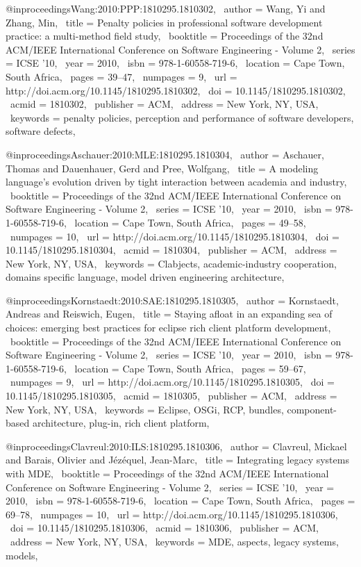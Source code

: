 @inproceedings{Wang:2010:PPP:1810295.1810302,
 author = {Wang, Yi and Zhang, Min},
 title = {Penalty policies in professional software development practice: a multi-method field study},
 booktitle = {Proceedings of the 32nd ACM/IEEE International Conference on Software Engineering - Volume 2},
 series = {ICSE '10},
 year = {2010},
 isbn = {978-1-60558-719-6},
 location = {Cape Town, South Africa},
 pages = {39--47},
 numpages = {9},
 url = {http://doi.acm.org/10.1145/1810295.1810302},
 doi = {10.1145/1810295.1810302},
 acmid = {1810302},
 publisher = {ACM},
 address = {New York, NY, USA},
 keywords = {penalty policies, perception and performance of software developers, software defects},
} 

@inproceedings{Aschauer:2010:MLE:1810295.1810304,
 author = {Aschauer, Thomas and Dauenhauer, Gerd and Pree, Wolfgang},
 title = {A modeling language's evolution driven by tight interaction between academia and industry},
 booktitle = {Proceedings of the 32nd ACM/IEEE International Conference on Software Engineering - Volume 2},
 series = {ICSE '10},
 year = {2010},
 isbn = {978-1-60558-719-6},
 location = {Cape Town, South Africa},
 pages = {49--58},
 numpages = {10},
 url = {http://doi.acm.org/10.1145/1810295.1810304},
 doi = {10.1145/1810295.1810304},
 acmid = {1810304},
 publisher = {ACM},
 address = {New York, NY, USA},
 keywords = {Clabjects, academic-industry cooperation, domains specific language, model driven engineering architecture},
} 

@inproceedings{Kornstaedt:2010:SAE:1810295.1810305,
 author = {Kornstaedt, Andreas and Reiswich, Eugen},
 title = {Staying afloat in an expanding sea of choices: emerging best practices for eclipse rich client platform development},
 booktitle = {Proceedings of the 32nd ACM/IEEE International Conference on Software Engineering - Volume 2},
 series = {ICSE '10},
 year = {2010},
 isbn = {978-1-60558-719-6},
 location = {Cape Town, South Africa},
 pages = {59--67},
 numpages = {9},
 url = {http://doi.acm.org/10.1145/1810295.1810305},
 doi = {10.1145/1810295.1810305},
 acmid = {1810305},
 publisher = {ACM},
 address = {New York, NY, USA},
 keywords = {Eclipse, OSGi, RCP, bundles, component-based architecture, plug-in, rich client platform},
} 

@inproceedings{Clavreul:2010:ILS:1810295.1810306,
 author = {Clavreul, Mickael and Barais, Olivier and J{\'e}z{\'e}quel, Jean-Marc},
 title = {Integrating legacy systems with MDE},
 booktitle = {Proceedings of the 32nd ACM/IEEE International Conference on Software Engineering - Volume 2},
 series = {ICSE '10},
 year = {2010},
 isbn = {978-1-60558-719-6},
 location = {Cape Town, South Africa},
 pages = {69--78},
 numpages = {10},
 url = {http://doi.acm.org/10.1145/1810295.1810306},
 doi = {10.1145/1810295.1810306},
 acmid = {1810306},
 publisher = {ACM},
 address = {New York, NY, USA},
 keywords = {MDE, aspects, legacy systems, models},
} 

